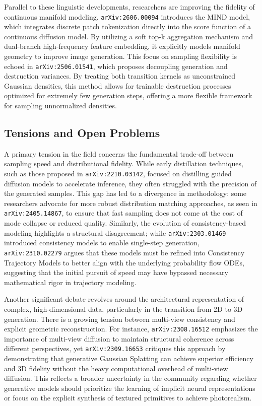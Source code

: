 \documentclass[11pt]{article}
\begin{document}
Parallel to these linguistic developments, researchers are improving the fidelity of continuous manifold modeling. \texttt{arXiv:2606.00094} introduces the MIND model, which integrates discrete patch tokenization directly into the score function of a continuous diffusion model. By utilizing a soft top-k aggregation mechanism and dual-branch high-frequency feature embedding, it explicitly models manifold geometry to improve image generation. This focus on sampling flexibility is echoed in \texttt{arXiv:2506.01541}, which proposes decoupling generation and destruction variances. By treating both transition kernels as unconstrained Gaussian densities, this method allows for trainable destruction processes optimized for extremely few generation steps, offering a more flexible framework for sampling unnormalized densities.

\subsection{Tensions and Open Problems}

A primary tension in the field concerns the fundamental trade-off between sampling speed and distributional fidelity. While early distillation techniques, such as those proposed in \texttt{arXiv:2210.03142}, focused on distilling guided diffusion models to accelerate inference, they often struggled with the precision of the generated samples. This gap has led to a divergence in methodology: some researchers advocate for more robust distribution matching approaches, as seen in \texttt{arXiv:2405.14867}, to ensure that fast sampling does not come at the cost of mode collapse or reduced quality. Similarly, the evolution of consistency-based modeling highlights a structural disagreement; while \texttt{arXiv:2303.01469} introduced consistency models to enable single-step generation, \texttt{arXiv:2310.02279} argues that these models must be refined into Consistency Trajectory Models to better align with the underlying probability flow ODEs, suggesting that the initial pursuit of speed may have bypassed necessary mathematical rigor in trajectory modeling.

Another significant debate revolves around the architectural representation of complex, high-dimensional data, particularly in the transition from 2D to 3D generation. There is a growing tension between multi-view consistency and explicit geometric reconstruction. For instance, \texttt{arXiv:2308.16512} emphasizes the importance of multi-view diffusion to maintain structural coherence across different perspectives, yet \texttt{arXiv:2309.16653} critiques this approach by demonstrating that generative Gaussian Splatting can achieve superior efficiency and 3D fidelity without the heavy computational overhead of multi-view diffusion. This reflects a broader uncertainty in the community regarding whether generative models should prioritize the learning of implicit neural representations or focus on the explicit synthesis of textured primitives to achieve photorealism.
\end{document}
